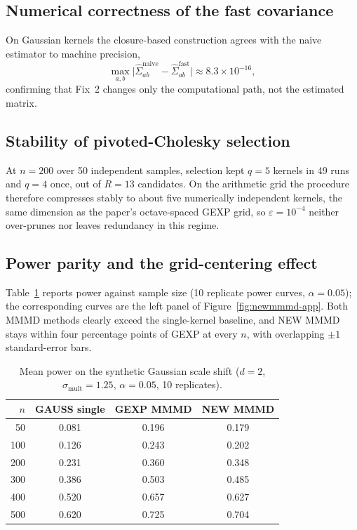\documentclass[12pt]{article}
\begin{document}
\subsection{Numerical correctness of the fast covariance}

On Gaussian kernels the closure-based construction agrees with the naive estimator to machine precision,
\[
  \max_{a,b}\big|\widehat{\Sigma}^{\text{naive}}_{ab}-\widehat{\Sigma}^{\text{fast}}_{ab}\big|\approx 8.3\times 10^{-16},
\]
confirming that Fix~2 changes only the computational path, not the estimated matrix.

\subsection{Stability of pivoted-Cholesky selection}

At $n=200$ over 50 independent samples, selection kept $q=5$ kernels in 49 runs and $q=4$ once, out of $R=13$ candidates. On the arithmetic grid the procedure therefore compresses stably to about five numerically independent kernels, the same dimension as the paper's octave-spaced GEXP grid, so $\varepsilon=10^{-4}$ neither over-prunes nor leaves redundancy in this regime.

\subsection{Power parity and the grid-centering effect}

Table~\ref{tab:app-newmmmd-power} reports power against sample size (10 replicate power curves, $\alpha=0.05$); the corresponding curves are the left panel of Figure~\ref{fig:newmmmd-app}. Both MMMD methods clearly exceed the single-kernel baseline, and NEW MMMD stays within four percentage points of GEXP at every $n$, with overlapping $\pm 1$ standard-error bars.

\begin{table}[H]
\centering
\caption{Mean power on the synthetic Gaussian scale shift ($d=2$, $\sigma_{\mathrm{mult}}=1.25$, $\alpha=0.05$, 10 replicates).}
\label{tab:app-newmmmd-power}
\scriptsize
\begin{tabular}{rccc}
\toprule
$n$ & GAUSS single & GEXP MMMD & NEW MMMD \\
\midrule
50  & 0.081 & 0.196 & 0.179 \\
100 & 0.126 & 0.243 & 0.202 \\
200 & 0.231 & 0.360 & 0.348 \\
300 & 0.386 & 0.503 & 0.485 \\
400 & 0.520 & 0.657 & 0.627 \\
500 & 0.620 & 0.725 & 0.704 \\
\bottomrule
\end{tabular}
\end{table}
\end{document}

